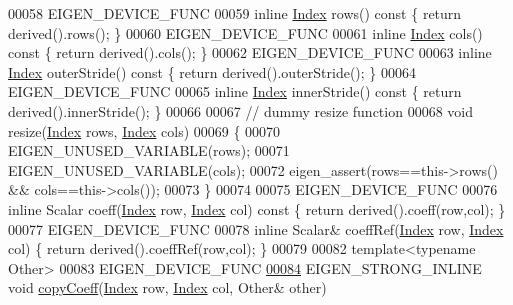 \begin{DoxyCode}
00058     EIGEN\_DEVICE\_FUNC
00059     \textcolor{keyword}{inline} \hyperlink{group___core___module_a554f30542cc2316add4b1ea0a492ff02}{Index} rows()\textcolor{keyword}{ const }\{ \textcolor{keywordflow}{return} derived().rows(); \}
00060     EIGEN\_DEVICE\_FUNC
00061     \textcolor{keyword}{inline} \hyperlink{group___core___module_a554f30542cc2316add4b1ea0a492ff02}{Index} cols()\textcolor{keyword}{ const }\{ \textcolor{keywordflow}{return} derived().cols(); \}
00062     EIGEN\_DEVICE\_FUNC
00063     \textcolor{keyword}{inline} \hyperlink{group___core___module_a554f30542cc2316add4b1ea0a492ff02}{Index} outerStride()\textcolor{keyword}{ const }\{ \textcolor{keywordflow}{return} derived().outerStride(); \}
00064     EIGEN\_DEVICE\_FUNC
00065     \textcolor{keyword}{inline} \hyperlink{group___core___module_a554f30542cc2316add4b1ea0a492ff02}{Index} innerStride()\textcolor{keyword}{ const }\{ \textcolor{keywordflow}{return} derived().innerStride(); \}
00066     
00067     \textcolor{comment}{// dummy resize function}
00068     \textcolor{keywordtype}{void} resize(\hyperlink{group___core___module_a554f30542cc2316add4b1ea0a492ff02}{Index} rows, \hyperlink{group___core___module_a554f30542cc2316add4b1ea0a492ff02}{Index} cols)
00069     \{
00070       EIGEN\_UNUSED\_VARIABLE(rows);
00071       EIGEN\_UNUSED\_VARIABLE(cols);
00072       eigen\_assert(rows==this->rows() && cols==this->cols());
00073     \}
00074 
00075     EIGEN\_DEVICE\_FUNC
00076     \textcolor{keyword}{inline} Scalar coeff(\hyperlink{group___core___module_a554f30542cc2316add4b1ea0a492ff02}{Index} row, \hyperlink{group___core___module_a554f30542cc2316add4b1ea0a492ff02}{Index} col)\textcolor{keyword}{ const  }\{ \textcolor{keywordflow}{return} derived().coeff(row,col); \}
00077     EIGEN\_DEVICE\_FUNC
00078     \textcolor{keyword}{inline} Scalar& coeffRef(\hyperlink{group___core___module_a554f30542cc2316add4b1ea0a492ff02}{Index} row, \hyperlink{group___core___module_a554f30542cc2316add4b1ea0a492ff02}{Index} col) \{ \textcolor{keywordflow}{return} derived().coeffRef(row,col); \}
00079 
00082     \textcolor{keyword}{template}<\textcolor{keyword}{typename} Other>
00083     EIGEN\_DEVICE\_FUNC
\hyperlink{group___core___module_ae93491f8454e133ff48202bf7c0c59e7}{00084}     EIGEN\_STRONG\_INLINE \textcolor{keywordtype}{void} \hyperlink{group___core___module_ae93491f8454e133ff48202bf7c0c59e7}{copyCoeff}(\hyperlink{group___core___module_a554f30542cc2316add4b1ea0a492ff02}{Index} row, \hyperlink{group___core___module_a554f30542cc2316add4b1ea0a492ff02}{Index} col, Other& other)

\end{DoxyCode}
